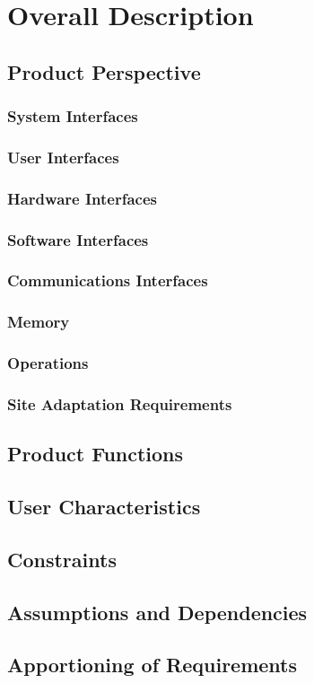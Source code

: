 \chapter{Overall Description}

\section{Product Perspective}

\subsection{System Interfaces}

\subsection{User Interfaces}

\subsection{Hardware Interfaces}

\subsection{Software Interfaces}

\subsection{Communications Interfaces}

\subsection{Memory}

\subsection{Operations}

\subsection{Site Adaptation Requirements}

\section{Product Functions}

\section{User Characteristics}

\section{Constraints}

\section{Assumptions and Dependencies}

\section{Apportioning of Requirements}